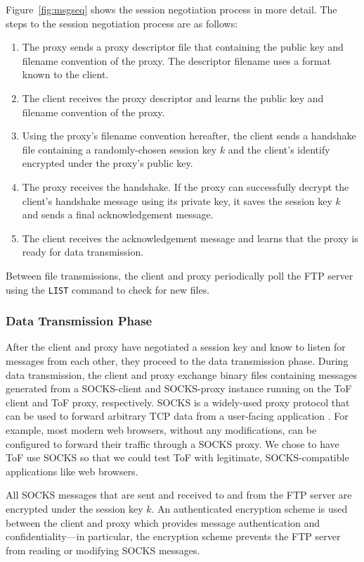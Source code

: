 \documentclass[letterpaper,twocolumn,11pt]{article}
\begin{document}
Figure~\ref{fig:msgseq} shows the session negotiation process in more detail.
The steps to the session negotiation process are as follows:
\begin{enumerate}
  \item The proxy sends a proxy descriptor file that containing the public
    key and filename convention of the proxy. The descriptor filename uses a
    format known to the client.
  \item The client receives the proxy descriptor and learns the public key and
    filename convention of the proxy.
  \item Using the proxy's filename convention hereafter, the client sends a
    handshake file containing a randomly-chosen session key $k$ and the
    client's identify encrypted under the proxy's public key.
  \item The proxy receives the handshake. If the proxy can successfully decrypt
    the client's handshake message using its private key,
    it saves the session key $k$ and sends a final acknowledgement message.
  \item The client receives the acknowledgement message and learns that the
    proxy is ready for data transmission.
\end{enumerate}

Between file transmissions, the client and proxy periodically poll the FTP
server using the \texttt{LIST} command to check for new files.

\subsubsection{Data Transmission Phase} \label{subsubsec:transmission}

After the client and proxy have negotiated a session key and know to listen for
messages from each other, they proceed to the data transmission phase. During
data transmission, the client and proxy exchange binary files containing
messages generated from a SOCKS-client and SOCKS-proxy instance running on the
ToF client and ToF proxy, respectively. SOCKS is a widely-used proxy protocol
that can be used to forward arbitrary TCP data from a user-facing application
\cite{socksrfc}.  For example, most modern web browsers, without any
modifications, can be configured to forward their traffic through a SOCKS
proxy. We chose to have ToF use SOCKS so that we could test ToF with legitimate,
SOCKS-compatible applications like web browsers.

All SOCKS messages that are sent and received to and from the FTP server are
encrypted under the session key $k$. An authenticated encryption scheme is used
between the client and proxy which provides message authentication and
confidentiality---in particular, the encryption scheme prevents the FTP server
from reading or modifying SOCKS messages.
\end{document}
